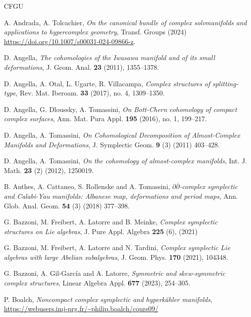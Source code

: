 \documentclass[a4paper]{amsart}
\theoremstyle{definition}
\theoremstyle{remark}
\numberwithin{equation}{section}
\begin{document}
\begin{thebibliography}{CFGU}


 A. Andrada, A. Tolcachier, {\it On the canonical bundle of complex solvmanifolds and applications to hypercomplex geometry}, Transf. Groups (2024) \url{https://doi.org/10.1007/s00031-024-09866-z}.

 D. Angella, {\it The cohomologies of the Iwasawa manifold and of its small deformations}, J. Geom. Anal. {\bf 23} (2011), 1355--1378.

 D. Angella, A. Otal, L. Ugarte, R. Villacampa, {\it Complex structures of splitting-type}, Rev. Mat. Iberoam. {\bf 33} (2017), no. 4, 1309--1350.

 D. Angella, G. Dloussky, A. Tomassini, {\it On Bott-Chern cohomology of compact complex surfaces}, Ann. Mat. Pura Appl. {\bf 195} (2016), no. 1, 199--217.

 D. Angella, A. Tomassini, {\it On Cohomological Decomposition of Almost-Complex Manifolds and Deformations}, J. Symplectic Geom. {\bf 9} (3) (2011) 403--428.

 D. Angella, A. Tomassini, 
{\it On the cohomology of almost-complex manifolds},
Int. J. Math. {\bf 23} (2) (2012), 1250019.

 B. Anthes, A. Cattaneo, S. Rollenske and A. Tomassini, {\it $\partial\overline\partial$-complex symplectic and Calabi-Yau manifolds: Albanese map, deformations and period maps}, Ann. Glob. Anal. Geom. {\bf 54} (3) (2018) 377--398.

 G. Bazzoni, M. Freibert, A. Latorre and B. Meinke, {\it Complex symplectic structures on Lie algebras}, J. Pure Appl. Algebra {\bf 225} (6), (2021)

 G. Bazzoni, M. Freibert, A. Latorre and N. Tardini, {\it Complex symplectic Lie algebras with large Abelian subalgebras}, J. Geom. Phys. {\bf 170} (2021), 104348.

 G. Bazzoni, A. Gil-García and A. Latorre, {\it Symmetric and skew-symmetric complex structures}, Linear Algebra Appl. {\bf 677} (2023), 254--305.

 P. Boalch, {\it Noncompact complex symplectic and hyperk\"ahler manifolds}, \url{https://webusers.imj-prg.fr/~philip.boalch/cours09/}


\end{thebibliography}
\end{document}
